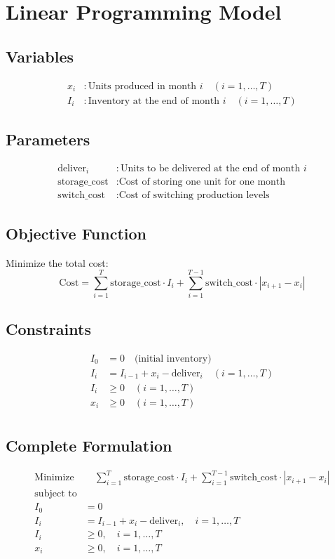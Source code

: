 \documentclass{article}
\begin{document}
\section*{Linear Programming Model}

\subsection*{Variables}
\begin{align*}
x_i & : \text{Units produced in month } i \quad (i = 1, \ldots, T) \\
I_i & : \text{Inventory at the end of month } i \quad (i = 1, \ldots, T)
\end{align*}

\subsection*{Parameters}
\begin{align*}
\text{deliver}_i & : \text{Units to be delivered at the end of month } i \\
\text{storage\_cost} & : \text{Cost of storing one unit for one month} \\
\text{switch\_cost} & : \text{Cost of switching production levels}
\end{align*}

\subsection*{Objective Function}
Minimize the total cost:
\[
\text{Cost} = \sum_{i=1}^{T} \text{storage\_cost} \cdot I_i + \sum_{i=1}^{T-1} \text{switch\_cost} \cdot |x_{i+1} - x_i|
\]

\subsection*{Constraints}
\begin{align*}
I_0 & = 0 \quad \text{(initial inventory)} \\
I_i & = I_{i-1} + x_i - \text{deliver}_i \quad (i = 1, \ldots, T) \\
I_i & \geq 0 \quad (i = 1, \ldots, T) \\
x_i & \geq 0 \quad (i = 1, \ldots, T) \\
\end{align*}

\subsection*{Complete Formulation}
\begin{align*}
\text{Minimize} & \quad \sum_{i=1}^{T} \text{storage\_cost} \cdot I_i + \sum_{i=1}^{T-1} \text{switch\_cost} \cdot |x_{i+1} - x_i| \\
\text{subject to} & \\
I_0 & = 0 \\
I_i & = I_{i-1} + x_i - \text{deliver}_i, \quad i = 1, \ldots, T \\
I_i & \geq 0, \quad i = 1, \ldots, T \\
x_i & \geq 0, \quad i = 1, \ldots, T \\
\end{align*}
\end{document}
